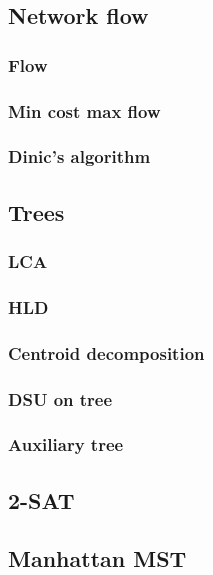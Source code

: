 \subsection{Network flow}
  \subsubsection{Flow}
  \subsubsection{Min cost max flow}
  \subsubsection{Dinic's algorithm}

\subsection{Trees}
  \subsubsection{LCA}
  \subsubsection{HLD}
  \subsubsection{Centroid decomposition}
  \subsubsection{DSU on tree}
  \subsubsection{Auxiliary tree}

\subsection{2-SAT}

\subsection{Manhattan MST}

